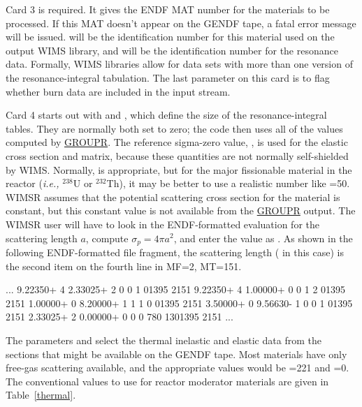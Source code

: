 Card 3 is required.  It gives the ENDF MAT number for
the materials to be processed.  If this MAT doesn't appear on
the GENDF tape, a fatal error message will be issued.  
will be the identification number for this material used on the
output WIMS library, and  will be the identification
number for the resonance data.  Formally, WIMS libraries allow for
data sets with more than one version of the resonance-integral
tabulation.  The last parameter on this card is  to
flag whether burn data are included in the input stream.

Card 4 starts out with  and ,
which define the size of the resonance-integral tables.  They
are normally both set to zero; the code then uses all of the
values computed by \hyperlink{sGROUPRhy}{GROUPR}.  The
reference sigma-zero value,
, is used for the elastic cross section and matrix,
because these quantities are not normally self-shielded by
WIMS.  Normally,  is appropriate, but for the major
fissionable material in the reactor ({\it i.e.,} $^{238}$U or
$^{232}$Th), it may be better to use a realistic number like
=50.  WIMSR assumes that the potential scattering
cross section for the material is constant, but this constant
value is not available from the
\hyperlink{sGROUPRhy}{GROUPR} output.  The WIMSR user
will have to look in the ENDF-formatted evaluation for the
scattering length $a$, compute $\sigma_{p}=4\pi a^2$, and enter
the value as .  As shown in the following ENDF-formatted
file fragment, the scattering length ( in this case)
is the second item on the fourth line in MF=2, MT=151.

\small
\begin{ccode}
 ...
 9.22350+ 4 2.33025+ 2          0          0          1          01395 2151
 9.22350+ 4 1.00000+ 0          0          1          2          01395 2151
 1.00000+ 0 8.20000+ 1          1          1          0          01395 2151
 3.50000+ 0 9.56630- 1          0          0          1          01395 2151
 2.33025+ 2 0.00000+ 0          0          0        780        1301395 2151
 ...
\end{ccode}
\normalsize

\vspace{1 pt}
The parameters  and  select the thermal
inelastic and elastic data from the sections that might be available
on the GENDF tape.  Most materials have only free-gas scattering
available, and the appropriate values would be =221
and =0.  The conventional values to use for reactor
moderator materials are given in Table~\ref{thermal}.

